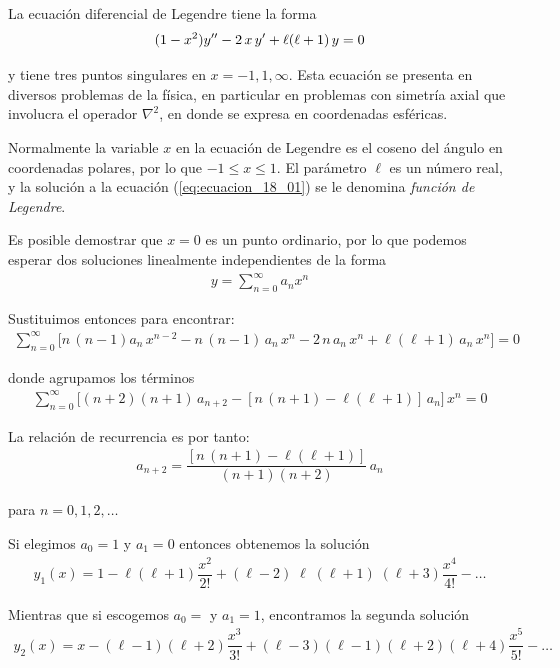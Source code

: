 La ecuación diferencial de Legendre tiene la forma
\begin{align}
(1 - x^{2}) {y}^{\prime \prime} - 2 \, x \, {y}^{\prime} + \ell (\ell + 1) \, y = 0
\label{eq:ecuacion_18_01}
\end{align}

y tiene tres puntos singulares en $x = -1, 1, \infty$. Esta ecuación se presenta en diversos problemas de la física, en particular en problemas con simetría axial que involucra el operador $\nabla^{2}$, en donde se expresa en coordenadas esféricas.
\par
Normalmente la variable $x$ en la ecuación de Legendre es el coseno del ángulo en coordenadas polares, por lo que $-1 \leq x \leq 1$. El parámetro $\ell$ es un número real, y la solución a la ecuación (\ref{eq:ecuacion_18_01}) se le denomina \emph{función de Legendre}.
\par
Es posible demostrar que $x = 0$ es un punto ordinario, por lo que podemos esperar dos soluciones linealmente independientes de la forma
\begin{align*}
y = \sum_{n=0}^{\infty} a_{n} x^{n}
\end{align*}

Sustituimos entonces para encontrar:
\begin{align*}
\sum_{n=0}^{\infty} \bigg[ n \, (n - 1) a_{n} \, x^{n-2} - n \, (n - 1) \, a_{n} \, x^{n} - 2 \, n \, a_{n} \, x^{n} + \ell (\ell + 1) \, a_{n} \, x^{n} \bigg] = 0
\end{align*}

donde agrupamos los términos
\begin{align*}
\sum_{n=0}^{\infty} \bigg[ (n + 2)(n + 1) \, a_{n+2} - [ n \, (n+1) - \ell (\ell + 1) ] \, a_{n} \bigg] \, x^{n} = 0
\end{align*}

La relación de recurrencia es por tanto:
\begin{align}
a_{n+2} = \dfrac{[n \, (n + 1)- \ell (\ell + 1)]}{(n + 1)(n + 2)} \, a_{n}
\label{eq:ecuacion_18_02}
\end{align}

para $n = 0, 1, 2, \ldots$
\par
Si elegimos $a_{0} = 1$ y $a_{1} = 0$ entonces obtenemos la solución
\begin{align}
y_{1}(x) = 1 - \ell (\ell + 1) \dfrac{x^{2}}{2!} + (\ell - 2)\; \ell \; (\ell + 1)\;(\ell + 3) \dfrac{x^{4}}{4!} - \ldots
\label{eq:ecuacion_18_03}
\end{align}

Mientras que si escogemos $a_{0} = $ y $ a_{1} = 1 $, encontramos la segunda solución
\begin{align}
y_{2}(x) = x - (\ell - 1)(\ell + 2) \dfrac{x^{3}}{3!} + (\ell - 3) (\ell - 1)(\ell + 2)(\ell + 4) \dfrac{x^{5}}{5!} - \ldots
\label{eq:ecuacion_18_04}
\end{align}

